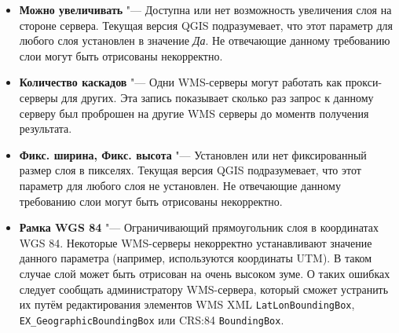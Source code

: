 \begin{itemize}[label=--]
\begin{itemize}[label=--]
\item \textbf{Можно увеличивать}    "--- Доступна или нет возможность
                                        увеличения слоя на стороне сервера.
                                        Текущая версия QGIS подразумевает, что
                                        этот параметр для любого слоя установлен
                                        в значение \textsl{Да}. Не отвечающие
                                        данному требованию слои могут быть
                                        отрисованы некорректно.

\item \textbf{Количество каскадов}  "--- Одни WMS-серверы могут работать как
                                        прокси-серверы для других. Эта запись
                                        показывает сколько раз запрос к данному
                                        серверу был проброшен на другие WMS
                                        серверы до моментв получения результата.

\item \textbf{Фикс. ширина, Фикс. высота}
                                   "--- Установлен или нет фиксированный
                                       размер слоя в пикселях. Текущая версия
                                       QGIS подразумевает, что этот параметр для
                                       любого слоя не установлен. Не отвечающие
                                       данному требованию слои могут быть
                                       отрисованы некорректно.

\item \textbf{Рамка WGS 84}        "--- Ограничивающий прямоугольник
                                       слоя в координатах WGS 84. Некоторые
                                       WMS-серверы некорректно устанавливают значение данного параметра
                                       (например, используются координаты UTM).
                                       В таком случае слой может быть отрисован
                                       на очень высоком зуме. О таких ошибках
                                       следует сообщать администратору WMS-сервера,
                                       который сможет устранить их
                                       путём редактирования элементов WMS XML
                                       \texttt{LatLonBoundingBox},
                                       \texttt{EX\_GeographicBoundingBox} или
                                       CRS:84 \texttt{BoundingBox}.


\end{itemize}
\end{itemize}
